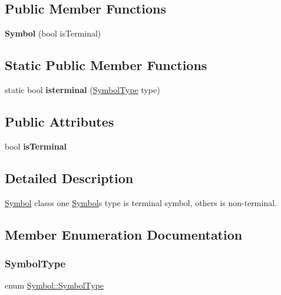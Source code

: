 \subsection*{Public Member Functions}
\begin{DoxyCompactItemize}
\item 
\hypertarget{class_symbol_aaea83d504a1096a6452d4da0d22a6cf2}{}\label{class_symbol_aaea83d504a1096a6452d4da0d22a6cf2} 
{\bfseries Symbol} (bool is\+Terminal)
\end{DoxyCompactItemize}
\subsection*{Static Public Member Functions}
\begin{DoxyCompactItemize}
\item 
\hypertarget{class_symbol_a9a898baa9dd070590594f294335d9125}{}\label{class_symbol_a9a898baa9dd070590594f294335d9125} 
static bool {\bfseries isterminal} (\hyperlink{class_symbol_a7ee37d4cfcb980f4eddf7ed1a028da5a}{Symbol\+Type} type)
\end{DoxyCompactItemize}
\subsection*{Public Attributes}
\begin{DoxyCompactItemize}
\item 
\hypertarget{class_symbol_a7911a477f0959199fd61fb6a37fb5397}{}\label{class_symbol_a7911a477f0959199fd61fb6a37fb5397} 
bool {\bfseries is\+Terminal}
\end{DoxyCompactItemize}


\subsection{Detailed Description}
\hyperlink{class_symbol}{Symbol} class\textquotesingle{}s one \hyperlink{class_symbol}{Symbol}\textquotesingle{}s type is terminal symbol, other\textquotesingle{}s is non-\/terminal. 

\subsection{Member Enumeration Documentation}
\hypertarget{class_symbol_a7ee37d4cfcb980f4eddf7ed1a028da5a}{}\label{class_symbol_a7ee37d4cfcb980f4eddf7ed1a028da5a} 
\subsubsection{\texorpdfstring{Symbol\+Type}{SymbolType}}
{\footnotesize\ttfamily enum \hyperlink{class_symbol_a7ee37d4cfcb980f4eddf7ed1a028da5a}{Symbol\+::\+Symbol\+Type}}


